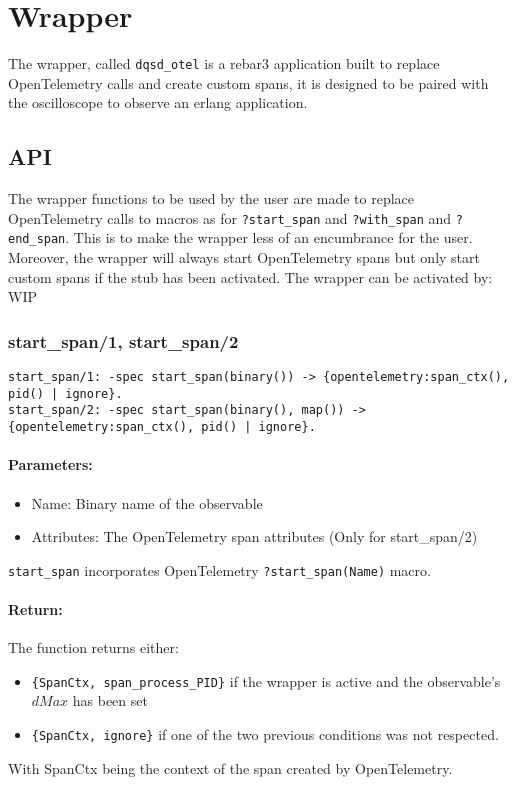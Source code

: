 \section{Wrapper}
    The wrapper, called \texttt{dqsd\_otel} is a rebar3 application built to replace OpenTelemetry calls and create custom spans, it is designed to be paired with the oscilloscope to observe an erlang application.
    
    \subsection{API}
        The wrapper functions to be used by the user are made to replace OpenTelemetry calls to macros as for \texttt{?start\_span} and \texttt{?with\_span} and \texttt{?end\_span}. This is to make the wrapper less of an encumbrance for the user. \\
        Moreover, the wrapper will always start OpenTelemetry spans but only start custom spans if the stub has been activated. The wrapper can be activated by: WIP 
        
       
        \subsubsection{start\_span/1, start\_span/2}
        
        \begin{verbatim}        
start_span/1: -spec start_span(binary()) -> {opentelemetry:span_ctx(), pid() | ignore}.
start_span/2: -spec start_span(binary(), map()) -> {opentelemetry:span_ctx(), pid() | ignore}.  
        \end{verbatim}
        
        \paragraph{Parameters:}
        \begin{itemize}
            \item Name: Binary name of the observable
            \item Attributes: The OpenTelemetry span attributes (Only for start\_span/2)
        \end{itemize} 
        
        \texttt{start\_span} incorporates OpenTelemetry \texttt{?start\_span(Name)} macro.
        
        \paragraph{Return:} 
        The function returns either:
        \begin{itemize}
            \item  \texttt{\{SpanCtx, span\_process\_PID\}} if the wrapper is active and the observable's $dMax$ has been set 
            \item \texttt{\{SpanCtx, ignore\}} if one of the two previous conditions was not respected.
        \end{itemize}
        With SpanCtx being the context of the span created by OpenTelemetry.
        
